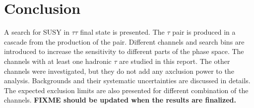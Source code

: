 \section{Conclusion}
\label{sect:conclusion}
A search for SUSY in $\tau\tau$ final state is presented. The $\tau$ pair is produced in a cascade from the production of the \PSGcpDo pair.
Different channels and search bins are introduced to increase the sensitivity to different parts of the phase space. 
The channels with at least one hadronic $\tau$ are studied in this report. The other channels were investigated, but they
do not add any axclusion power to the analysis.
Backgrounds and their systematic uncertainties are discussed in details. 
The expected exclusion limits are also presented for different combination of the 
channels.
{\bf FIXME should be updated when the results are finalized.}
